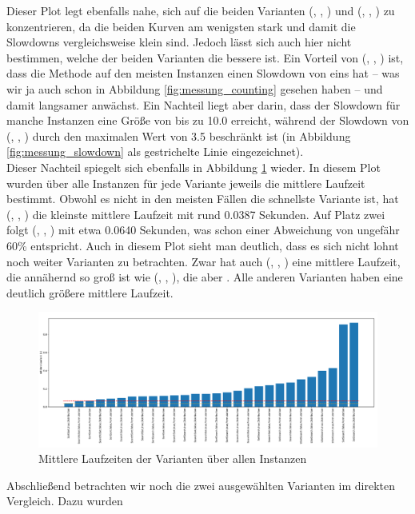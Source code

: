 Dieser Plot legt ebenfalls nahe, sich auf die beiden Varianten (\SeaUSet, \false, \perm) und 
(\SorSor, \true, \distr) zu konzentrieren, da die beiden Kurven am wenigsten stark  und damit 
die Slowdowns vergleichsweise klein sind. Jedoch lässt sich auch hier nicht bestimmen, welche der beiden
Varianten die bessere ist. Ein Vorteil von (\SeaUSet, \false, \perm) ist, 
dass die Methode auf den meisten Instanzen einen Slowdown
von eins hat -- was wir ja auch schon in Abbildung \ref{fig:messung_counting} gesehen haben --
und damit langsamer anwächst. Ein Nachteil liegt aber darin, dass der Slowdown für manche Instanzen
eine Größe von bis zu 10.0 erreicht, während der Slowdown von  (\SorSor, \true, \distr) durch den maximalen
Wert von 3.5 beschränkt ist (in Abbildung \ref{fig:messung_slowdown} als gestrichelte Linie eingezeichnet).
\\
Dieser Nachteil spiegelt sich ebenfalls in Abbildung \ref{fig:messung_mean} wieder. In diesem Plot
wurden über alle Instanzen für jede Variante jeweils die mittlere Laufzeit bestimmt. Obwohl
es nicht in den meisten Fällen die schnellste Variante ist, hat (\SorSor, \true, \distr) die 
kleinste mittlere Laufzeit mit rund 0.0387 Sekunden. Auf Platz zwei folgt
(\SeaUSet, \false, \perm) mit etwa 0.0640 Sekunden, was schon einer Abweichung von ungefähr 60\% entspricht.
Auch in diesem Plot sieht man deutlich, dass es sich nicht lohnt noch weiter Varianten zu betrachten. Zwar hat 
auch (\SorSor, \true, \perm) eine mittlere Laufzeit, die annähernd so groß ist wie (\SeaUSet, \false, \perm),{}
die aber . Alle anderen Varianten haben eine deutlich größere mittlere
Laufzeit.
\begin{figure}[h]
\centering
	\includegraphics[width = \textwidth]{figures/mean.pdf}
	\caption{Mittlere Laufzeiten der Varianten über allen Instanzen}
	\label{fig:messung_mean}
\end{figure}
Abschließend betrachten wir noch die zwei ausgewählten Varianten im direkten Vergleich. Dazu wurden
